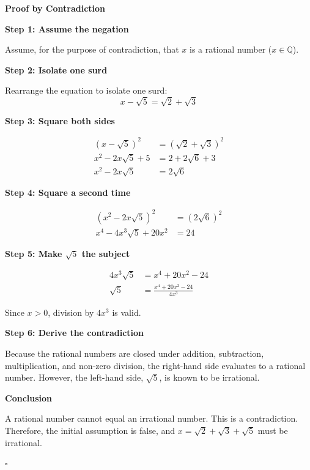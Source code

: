 \begin{solution}
\textbf{Proof by Contradiction}

\textbf{Step 1: Assume the negation}

Assume, for the purpose of contradiction, that $x$ is a rational number ($x \in \mathbb{Q}$).

\textbf{Step 2: Isolate one surd}

Rearrange the equation to isolate one surd:
\[
x - \sqrt{5} = \sqrt{2} + \sqrt{3}
\]

\textbf{Step 3: Square both sides}

\begin{align*}
(x - \sqrt{5})^2 &= (\sqrt{2} + \sqrt{3})^2 \\
x^2 - 2x\sqrt{5} + 5 &= 2 + 2\sqrt{6} + 3 \\
x^2 - 2x\sqrt{5} &= 2\sqrt{6}
\end{align*}

\textbf{Step 4: Square a second time}

\begin{align*}
(x^2 - 2x\sqrt{5})^2 &= (2\sqrt{6})^2 \\
x^4 - 4x^3\sqrt{5} + 20x^2 &= 24
\end{align*}

\textbf{Step 5: Make $\sqrt{5}$ the subject}

\begin{align*}
4x^3\sqrt{5} &= x^4 + 20x^2 - 24 \\
\sqrt{5} &= \frac{x^4 + 20x^2 - 24}{4x^3}
\end{align*}

Since $x > 0$, division by $4x^3$ is valid.

\textbf{Step 6: Derive the contradiction}

Because the rational numbers are closed under addition, subtraction, multiplication, and non-zero division, the right-hand side evaluates to a rational number. However, the left-hand side, $\sqrt{5}$, is known to be irrational.

\textbf{Conclusion}

A rational number cannot equal an irrational number. This is a contradiction. Therefore, the initial assumption is false, and $x = \sqrt{2} + \sqrt{3} + \sqrt{5}$ must be irrational.

\hfill $\square$
\end{solution}

